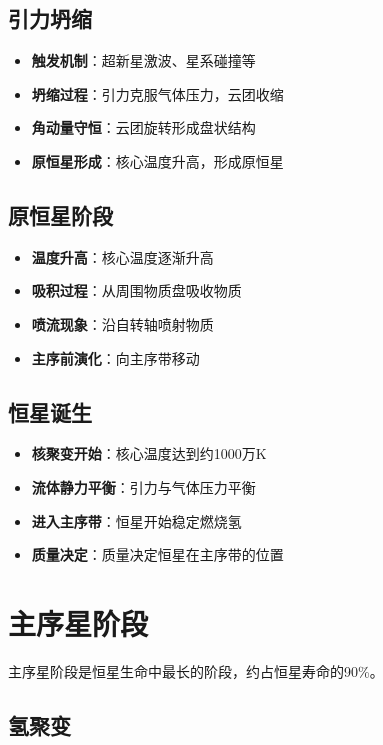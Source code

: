 \documentclass[12pt,UTF8]{ctexbook}
\begin{document}
\subsection{引力坍缩}

\begin{itemize}
  \item \textbf{触发机制}：超新星激波、星系碰撞等
  \item \textbf{坍缩过程}：引力克服气体压力，云团收缩
  \item \textbf{角动量守恒}：云团旋转形成盘状结构
  \item \textbf{原恒星形成}：核心温度升高，形成原恒星
\end{itemize}

\subsection{原恒星阶段}

\begin{itemize}
  \item \textbf{温度升高}：核心温度逐渐升高
  \item \textbf{吸积过程}：从周围物质盘吸收物质
  \item \textbf{喷流现象}：沿自转轴喷射物质
  \item \textbf{主序前演化}：向主序带移动
\end{itemize}

\subsection{恒星诞生}

\begin{itemize}
  \item \textbf{核聚变开始}：核心温度达到约1000万K
  \item \textbf{流体静力平衡}：引力与气体压力平衡
  \item \textbf{进入主序带}：恒星开始稳定燃烧氢
  \item \textbf{质量决定}：质量决定恒星在主序带的位置
\end{itemize}

\section{主序星阶段}

主序星阶段是恒星生命中最长的阶段，约占恒星寿命的90\%。

\subsection{氢聚变}
\end{document}
